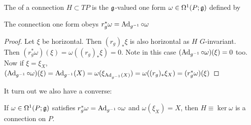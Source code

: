 \documentclass{article}
\begin{document}
\begin{definition}
The  of a connection $H \subset TP$ is the $\mathfrak{g}$-valued one form $\omega \in \Omega^1(P;\mathfrak{g})$ defined by 
\end{definition}

\begin{prop}
The connection one form obeys $r_g^\ast \omega = \operatorname{Ad}_{g^{-1}} \circ \omega$
\end{prop}
\begin{proof}
Let $\xi$ be horizontal. Then $(r_g)_\ast \xi$ is also horizontal as $H$ $G$-invariant. Then $(r_g^\ast \omega)(\xi) = \omega((r_g)_\ast \xi) = 0$. Note in this case $(\operatorname{Ad}_{g^{-1}} \circ \omega)(\xi) = 0$ too. \\
Now if $\xi = \xi_X$, $(\operatorname{Ad}_{g^{-1}} \circ \omega)(\xi) = \operatorname{Ad}_{g^{-1}}(X) = \omega(\xi_{\operatorname{Ad}_{g^{-1}}(X)}) = \omega((r_g)_\ast \xi_X) = (r_g^\ast \omega)(\xi)$
\end{proof}
It turn out we also have a converse:
\begin{prop}
If $\omega \in \Omega^1(P;\mathfrak{g})$ satisfies $r_g^\ast \omega = \operatorname{Ad}_{g^{-1}} \circ \omega$ and $\omega(\xi_X) = X$, then $H\equiv \ker \omega$ is a connection on $P$. 
\end{prop}
\end{document}
